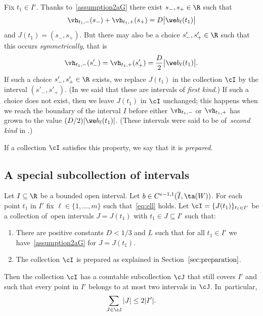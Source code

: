 Fix $t_1 \in I'$. Thanks to~\eqref{assumption2aG} there exist $s_-,s_+ \in \R$ such that
\begin{gather*}
\vh_{t_1,-}(s_-) + \vh_{t_1,+}(s_+) = D \big|\we b_\ell(t_1)\big|
\end{gather*}
and $J(t_1) = (s_-,s_+)$.
But there may also be a choice $s'_-,s'_+ \in \R$ such that this occurs \emph{symmetrically}, that is
\begin{gather*} %
 \vh_{t_1,-}(s'_-) = \vh_{t_1,+}(s'_+) = \frac D 2\big|\we b_\ell(t_1)\big|.
 \end{gather*}
If such a choice $s'_-,s'_+ \in \R$ exists, we replace $J(t_1)$ in the collection $\cI$ by the interval $(s'_-,s'_+)$.
(In \cite{ParusinskiRainer15} we said that these are intervals of \emph{first kind}.)
If such a choice does not exist, then we leave $J(t_1)$ in $\cI$ unchanged;
this happens when
we reach the boundary of the interval $I$ before either $\vh_{t_1,-}$ or $\vh_{t_1,+}$ has
 grown to the value $(D/2)|\we b_\ell(t_1)|$. (These intervals were said to be of~\emph{second kind} in \cite{ParusinskiRainer15}.)

If a collection $\cI$ satisfies this property, we say that it is \emph{prepared}.



\subsection{A special subcollection of intervals}


\begin{Proposition} \label{cover}
 Let $I \subseteq \R$ be a bounded open interval.
 Let $b \in C^{e-1,1}(\overline I,\ta(W))$.
 For each point $t_1$ in $I'$ fix $\ell \in \{1, \dots, m\}$ such that~\eqref{eq:ell} holds.
 Let $\cI=\{J(t_1)\}_{t_1\in I'}$ be a collection of~open intervals $J=J(t_1)$ with $t_1 \in J \subseteq I'$ such that:
\begin{enumerate}\itemsep=0pt
 \item[$1.$] There are positive constants $D < 1/3$ and $L$ such that
 for all $t_1 \in I'$ we have~\eqref{assumption2aG} for $J=J(t_1)$.
 \item[$2.$] The collection $\cI$ is prepared as explained in Section~$\ref{sec:preparation}$.
 \end{enumerate}
Then the collection $\cI$ has a countable subcollection $\cJ$ that still
 covers $I'$ and such that every point in $I'$ belongs to at most two intervals in $\cJ$. In~particular,
 \begin{gather*}
 \sum_{J \in \cJ} |J| \le 2 |I'|.
 \end{gather*}
\end{Proposition}

